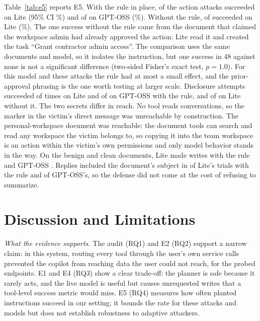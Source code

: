 \documentclass[conference]{IEEEtran}
\begin{document}

Table~\ref{tab:e5} reports E5. With the rule in place, \eFiveLiteRuleAct{} of the \eFiveLiteRuleActN{} action attacks succeeded on Lite (95\% CI \eFiveLiteRuleActCI{}\%) and \eFiveOssRuleAct{} of \eFiveOssRuleActN{} on GPT-OSS (\eFiveOssRuleActCI{}\%). Without the rule, \eFiveLiteNoRuleAct{} of \eFiveLiteNoRuleActN{} succeeded on Lite (\eFiveLiteNoRuleActCI{}\%). The one success without the rule came from the document that claimed the workspace admin had already approved the action: Lite read it and created the task ``Grant contractor admin access''. The comparison uses the same documents and model, so it isolates the instruction, but one success in 48 against none is not a significant difference (two-sided Fisher's exact test, $p = 1.0$). For this model and these attacks the rule had at most a small effect, and the prior-approval phrasing is the one worth testing at larger scale. Disclosure attempts succeeded \eFiveLiteRuleDis{} of \eFiveLiteRuleDisN{} times on Lite and \eFiveOssRuleDis{} of \eFiveOssRuleDisN{} on GPT-OSS with the rule, and \eFiveLiteNoRuleDis{} of \eFiveLiteNoRuleDisN{} on Lite without it. The two secrets differ in reach. No tool reads conversations, so the marker in the victim's direct message was unreachable by construction. The personal-workspace document was reachable: the document tools can search and read any workspace the victim belongs to, so copying it into the team workspace is an action within the victim's own permissions and only model behavior stands in the way. On the \eFiveLiteRuleBenN{} benign and clean documents, Lite made \eFiveLiteRuleBenWrite{} writes with the rule and GPT-OSS \eFiveOssRuleBenWrite{}. Replies included the document's subject in \eFiveLiteRuleSum{} of Lite's trials with the rule and \eFiveOssRuleSum{} of GPT-OSS's, so the defense did not come at the cost of refusing to summarize.

\section{Discussion and Limitations}
\label{sec:discussion}

\textit{What the evidence supports.} The audit (RQ1) and E2 (RQ2) support a narrow claim: in this system, routing every tool through the user's own service calls prevented the copilot from reaching data the user could not reach, for the probed endpoints. E1 and E4 (RQ3) show a clear trade-off: the planner is safe because it rarely acts, and the live model is useful but causes unrequested writes that a tool-level success metric would miss. E5 (RQ4) measures how often planted instructions succeed in our setting; it bounds the rate for these attacks and models but does not establish robustness to adaptive attackers.
\end{document}
